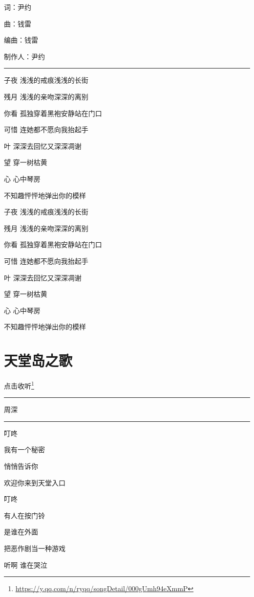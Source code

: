 \documentclass[]{ctexbook}
\renewcommand{\href}[2]{#2\footnote{\url{#1}}}
\begin{document}
词：尹约

曲：钱雷

编曲：钱雷

制作人：尹约

\begin{center}\rule{0.5\linewidth}{0.5pt}\end{center}

子夜 浅浅的戒痕浅浅的长街

残月 浅浅的亲吻深深的离别

你看 孤独穿着黑袍安静站在门口

可惜 连她都不愿向我抬起手

叶 深深去回忆又深深凋谢

望 穿一树枯黄

心 心中琴房

不知趣怦怦地弹出你的模样

子夜 浅浅的戒痕浅浅的长街

残月 浅浅的亲吻深深的离别

你看 孤独穿着黑袍安静站在门口

可惜 连她都不愿向我抬起手

叶 深深去回忆又深深凋谢

望 穿一树枯黄

心 心中琴房

不知趣怦怦地弹出你的模样

\section*{天堂岛之歌}\label{haven-song}


\href{https://y.qq.com/n/ryqq/songDetail/000gUmh94eXmmP}{点击收听}

\begin{center}\rule{0.5\linewidth}{0.5pt}\end{center}

周深

\begin{center}\rule{0.5\linewidth}{0.5pt}\end{center}

叮咚

我有一个秘密

悄悄告诉你

欢迎你来到天堂入口

叮咚

有人在按门铃

是谁在外面

把恶作剧当一种游戏

听啊 谁在哭泣
\end{document}

